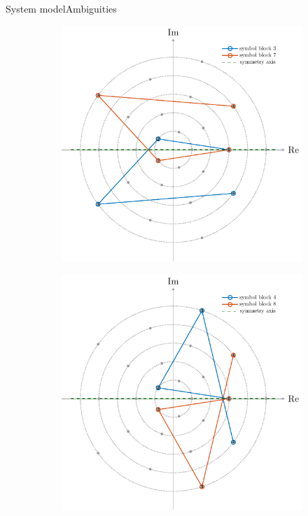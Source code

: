 \documentclass[en]{sdqbeamer}
\begin{document}
\begin{frame}{System model}{Ambiguities}
\begin{figure}[htb]
     \centering
     \begin{subfigure}[b]{0.4\textwidth}
         \centering
         \includegraphics[width=\textwidth]{Eq_class_construction_6.pdf}
     \end{subfigure}
     \hspace{10mm}
     \begin{subfigure}[b]{0.4\textwidth}
         \centering
         \includegraphics[width=\textwidth]{Eq_class_construction_7.pdf}
     \end{subfigure}
\end{figure}

\end{frame}
\end{document}

